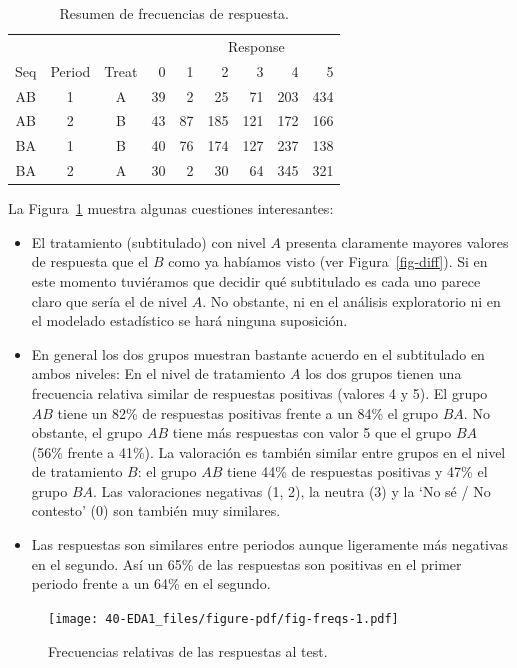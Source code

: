 \documentclass[
  12pt,
  a4paper,
  extrafontsizes,
  onecolumn,
  openright]{memoir}
\begin{document}
\hypertarget{tbl-resume}{}
\begin{longtable}{cccrrrrrr}
\caption{\label{tbl-resume}Resumen de frecuencias de respuesta. }\tabularnewline

\toprule
 &  &  &  & \multicolumn{5}{c}{Response} \\ 
\cmidrule(lr){5-9}
Seq & Period & Treat & 0 & 1 & 2 & 3 & 4 & 5 \\ 
\midrule
AB & 1 & A & 39 & 2 & 25 & 71 & 203 & 434 \\ 
AB & 2 & B & 43 & 87 & 185 & 121 & 172 & 166 \\ 
BA & 1 & B & 40 & 76 & 174 & 127 & 237 & 138 \\ 
BA & 2 & A & 30 & 2 & 30 & 64 & 345 & 321 \\ 
\bottomrule
\end{longtable}

La Figura~\ref{fig-freqs} muestra algunas cuestiones interesantes:

\begin{itemize}
\item
  El tratamiento (subtitulado) con nivel \(A\) presenta claramente
  mayores valores de respuesta que el \(B\) como ya habíamos visto (ver
  Figura~\ref{fig-diff}). Si en este momento tuviéramos que decidir qué
  subtitulado es cada uno parece claro que sería el de nivel \(A\). No
  obstante, ni en el análisis exploratorio ni en el modelado estadístico
  se hará ninguna suposición.
\item
  En general los dos grupos muestran bastante acuerdo en el subtitulado
  en ambos niveles: En el nivel de tratamiento \(A\) los dos grupos
  tienen una frecuencia relativa similar de respuestas positivas
  (valores 4 y 5). El grupo \(AB\) tiene un 82\% de respuestas positivas
  frente a un 84\% el grupo \(BA\). No obstante, el grupo \(AB\) tiene
  más respuestas con valor 5 que el grupo \(BA\) (56\% frente a 41\%).
  La valoración es también similar entre grupos en el nivel de
  tratamiento \(B\): el grupo \(AB\) tiene 44\% de respuestas positivas
  y 47\% el grupo \(BA\). Las valoraciones negativas (1, 2), la neutra
  (3) y la \enquote*{No sé / No contesto} (0) son también muy similares.
\item
  Las respuestas son similares entre periodos aunque ligeramente más
  negativas en el segundo. Así un 65\% de las respuestas son positivas
  en el primer periodo frente a un 64\% en el segundo.
\end{itemize}

\begin{figure}[h]

{\centering \texttt{[image: 40-EDA1\_files/figure-pdf/fig-freqs-1.pdf]}

}

\caption{\label{fig-freqs}Frecuencias relativas de las respuestas al
test.}

\end{figure}
\end{document}
